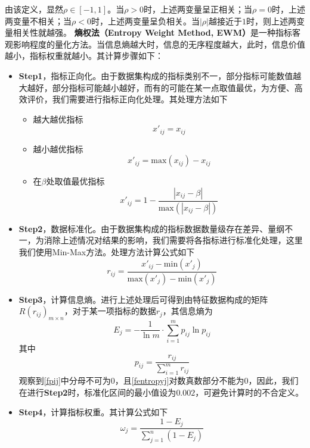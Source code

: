\documentclass{MathorCupmodeling}
\begin{document}
	由该定义，显然$\rho\in[-1,1]$。当$\rho>0$时，上述两变量呈正相关；当$\rho=0$时，上述两变量不相关；当$\rho<0$时，上述两变量呈负相关。当$\left|\rho\right|$越接近于$1$时，则上述两变量相关性就越强\textcolor{blue}{\cite{ppearson2}}。
\newpage
	\textbf{熵权法（Entropy Weight Method, EWM）}是一种指标客观影响程度的量化方法。当信息熵越大时，信息的无序程度越大，此时，信息价值越小，指标权重就越小\textcolor{blue}{\cite{pewm1}}。其计算步骤如下：
	\begin{itemize}
		\item \textbf{Step1}，指标正向化。由于数据集构成的指标类别不一，部分指标可能数值越大越好，部分指标可能越小越好，而有的可能在某一点取值最优，为方便、高效评价，我们需要进行指标正向化处理\textcolor{blue}{\cite{pewm2}}。其处理方法如下
		\begin{itemize}
			\item {\heiti 越大越优指标}
			\begin{equation}
				x'_{ij}=x_{ij} \label{fmax}
			\end{equation}
			\item {\heiti 越小越优指标}
			\begin{equation}
				x'_{ij}=\mathrm{max}\left(x_{ij}\right)-x_{ij} \label{fmin}
			\end{equation}
			\item {\heiti 在$\beta$处取值最优指标}
			\begin{equation}
				x'_{ij}=1-\frac{\left|x_{ij}-\beta\right|}{\mathrm{max}\left(\left|x_{ij}-\beta\right|\right)} \label{fmid}
			\end{equation}
		\end{itemize}
		\item \textbf{Step2}，数据标准化。由于数据集构成的指标数据数量级存在差异、量纲不一，为消除上述情况对结果的影响，我们需要将各指标进行标准化处理，这里我们使用Min-Max方法。处理方法计算公式如下
		\begin{equation}
			r_{ij}=\frac{x'_{ij}-\mathrm{min}\left(x'_{j}\right)}{\mathrm{max}\left(x'_{j}\right)-\mathrm{min}\left(x'_{j}\right)} \label{Min-Max}
		\end{equation}
		\item \textbf{Step3}，计算信息熵。进行上述处理后可得到由特征数据构成的矩阵$R\left(r_{ij}\right)_{m\times n}$，对于某一项指标的数据$r_j$，其信息熵为
		\begin{equation}
			E_j=-\frac{1}{\ln m}\cdot\sum\limits_{i=1}^{m}p_{ij}\ln p_{ij} \label{fentropyj}
		\end{equation}
		其中
		\begin{equation}
			p_{ij}=\frac{r_{ij}}{\sum\limits_{i=1}^{m}r_{ij}} \label{fpij}
		\end{equation}
		观察到\textcolor{blue}{\eqref{fpij}}中分母不可为$0$，且\textcolor{blue}{\eqref{fentropyj}}对数真数部分不能为$0$，因此，我们在进行\textbf{Step2}时，标准化区间的最小值设为$0.002$，可避免计算时的不合定义。
		\item \textbf{Step4}，计算指标权重。其计算公式如下
		\begin{equation}
			\omega_j=\frac{1-E_j}{\sum\limits_{j=1}^{n}\left(1-E_j\right)} \label{fwj}
		\end{equation}
	\end{itemize}
\end{document}
